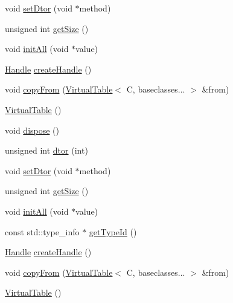 \begin{DoxyCompactItemize}
\item 
void \mbox{\hyperlink{structfakeit_1_1VirtualTable_adee13076280ff9bd4c06b5f1e62d6708}{set\+Dtor}} (void $\ast$method)
\item 
unsigned int \mbox{\hyperlink{structfakeit_1_1VirtualTable_a014d48c976f89207564bf8d68b64a039}{get\+Size}} ()
\item 
void \mbox{\hyperlink{structfakeit_1_1VirtualTable_a261b66b33067b4425791762cb3786f20}{init\+All}} (void $\ast$value)
\item 
\mbox{\hyperlink{classfakeit_1_1VirtualTable_1_1Handle}{Handle}} \mbox{\hyperlink{structfakeit_1_1VirtualTable_a616ff0e7567c8c5f368faff1dca949df}{create\+Handle}} ()
\item 
void \mbox{\hyperlink{structfakeit_1_1VirtualTable_a79d7c3b29e6da1ba1974c8c9d69fd7bd}{copy\+From}} (\mbox{\hyperlink{structfakeit_1_1VirtualTable}{Virtual\+Table}}$<$ C, baseclasses... $>$ \&from)
\item 
\mbox{\hyperlink{structfakeit_1_1VirtualTable_ae64da18818c25b107d8f9f2c615c4c37}{Virtual\+Table}} ()
\item 
void \mbox{\hyperlink{structfakeit_1_1VirtualTable_a58c2bfa93deb68aba5eced688c168e66}{dispose}} ()
\item 
unsigned int \mbox{\hyperlink{structfakeit_1_1VirtualTable_a7be0619d713b6ae2cac5722895176a14}{dtor}} (int)
\item 
void \mbox{\hyperlink{structfakeit_1_1VirtualTable_adee13076280ff9bd4c06b5f1e62d6708}{set\+Dtor}} (void $\ast$method)
\item 
unsigned int \mbox{\hyperlink{structfakeit_1_1VirtualTable_a014d48c976f89207564bf8d68b64a039}{get\+Size}} ()
\item 
void \mbox{\hyperlink{structfakeit_1_1VirtualTable_a261b66b33067b4425791762cb3786f20}{init\+All}} (void $\ast$value)
\item 
const std\+::type\+\_\+info $\ast$ \mbox{\hyperlink{structfakeit_1_1VirtualTable_a5ed35b122d5d06afced80ab93062bfa3}{get\+Type\+Id}} ()
\item 
\mbox{\hyperlink{classfakeit_1_1VirtualTable_1_1Handle}{Handle}} \mbox{\hyperlink{structfakeit_1_1VirtualTable_a616ff0e7567c8c5f368faff1dca949df}{create\+Handle}} ()
\item 
void \mbox{\hyperlink{structfakeit_1_1VirtualTable_a79d7c3b29e6da1ba1974c8c9d69fd7bd}{copy\+From}} (\mbox{\hyperlink{structfakeit_1_1VirtualTable}{Virtual\+Table}}$<$ C, baseclasses... $>$ \&from)
\item 
\mbox{\hyperlink{structfakeit_1_1VirtualTable_ae64da18818c25b107d8f9f2c615c4c37}{Virtual\+Table}} ()

\end{DoxyCompactItemize}
